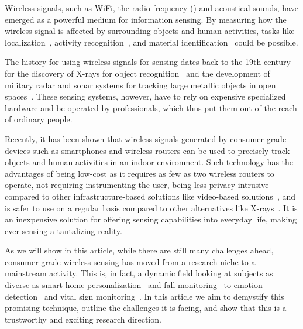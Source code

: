 Wireless signals, such as WiFi, the radio frequency (\RF) and acoustical sounds, have emerged as a powerful medium for information sensing.
By measuring how the wireless signal is affected by surrounding objects and human activities, tasks like localization~\cite{Arraytrack,
Tagoram}, activity recognition~\cite{Wang2015Understanding, wang2016human}, and material identification~\cite{Tagscan, LiquID, zhao2018rf}
could be possible.


The history for using wireless signals for sensing dates back to the 19th century  for the discovery of X-rays for object
recognition~\cite{Suzuki1996} and the development of military radar and sonar systems for tracking large metallic objects in open
spaces~\cite{Au1988Sonar}. These sensing systems, however, have to rely on expensive specialized hardware and be operated by professionals, which
thus put them out of the reach of ordinary people.


Recently, it has been shown that wireless signals generated by consumer-grade devices such as smartphones and wireless routers can be used
to precisely track objects and human activities in an indoor environment. Such technology has the advantages of being low-cost as it
requires as few as two wireless routers to operate, not requiring instrumenting the user, being less privacy intrusive compared to other
infrastructure-based solutions like video-based solutions~\cite{Cruz2015Quantification}, and is safer to use on a regular basis compared to
other alternatives like X-rays~\cite{De2013B}. It is an inexpensive solution for offering sensing capabilities into everyday life, making
ever sensing a tantalizing reality.

As we will show in this article, while there are still many challenges ahead, consumer-grade wireless sensing has moved from a research
niche to a mainstream activity. This is, in fact, a dynamic field looking at subjects as diverse as smart-home personalization~\cite{vasisht2016decimeter} and
fall monitoring~\cite{wang2017wifall} to emotion detection~\cite{Zhao2017Emotion} and vital sign monitoring~\cite{Smart-homes}. In this article we aim to demystify this promising
technique, outline the challenges it is facing, and show that this is a trustworthy and exciting research direction.






